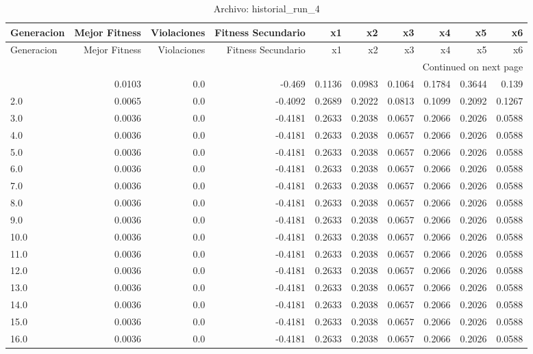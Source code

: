 \begin{longtable}{lrrrrrrrrr}
\caption{Archivo: historial\_run\_4}\label{tab:historial_run_4} \\
\toprule
Generacion & Mejor Fitness & Violaciones & Fitness Secundario & x1 & x2 & x3 & x4 & x5 & x6 \\
\midrule
\endfirsthead
\toprule
Generacion & Mejor Fitness & Violaciones & Fitness Secundario & x1 & x2 & x3 & x4 & x5 & x6 \\
\midrule
\endhead
\midrule
\multicolumn{10}{r}{Continued on next page} \\
\midrule
\endfoot
\bottomrule
\endlastfoot
1.0 & 0.0103 & 0.0 & -0.469 & 0.1136 & 0.0983 & 0.1064 & 0.1784 & 0.3644 & 0.139 \\
2.0 & 0.0065 & 0.0 & -0.4092 & 0.2689 & 0.2022 & 0.0813 & 0.1099 & 0.2092 & 0.1267 \\
3.0 & 0.0036 & 0.0 & -0.4181 & 0.2633 & 0.2038 & 0.0657 & 0.2066 & 0.2026 & 0.0588 \\
4.0 & 0.0036 & 0.0 & -0.4181 & 0.2633 & 0.2038 & 0.0657 & 0.2066 & 0.2026 & 0.0588 \\
5.0 & 0.0036 & 0.0 & -0.4181 & 0.2633 & 0.2038 & 0.0657 & 0.2066 & 0.2026 & 0.0588 \\
6.0 & 0.0036 & 0.0 & -0.4181 & 0.2633 & 0.2038 & 0.0657 & 0.2066 & 0.2026 & 0.0588 \\
7.0 & 0.0036 & 0.0 & -0.4181 & 0.2633 & 0.2038 & 0.0657 & 0.2066 & 0.2026 & 0.0588 \\
8.0 & 0.0036 & 0.0 & -0.4181 & 0.2633 & 0.2038 & 0.0657 & 0.2066 & 0.2026 & 0.0588 \\
9.0 & 0.0036 & 0.0 & -0.4181 & 0.2633 & 0.2038 & 0.0657 & 0.2066 & 0.2026 & 0.0588 \\
10.0 & 0.0036 & 0.0 & -0.4181 & 0.2633 & 0.2038 & 0.0657 & 0.2066 & 0.2026 & 0.0588 \\
11.0 & 0.0036 & 0.0 & -0.4181 & 0.2633 & 0.2038 & 0.0657 & 0.2066 & 0.2026 & 0.0588 \\
12.0 & 0.0036 & 0.0 & -0.4181 & 0.2633 & 0.2038 & 0.0657 & 0.2066 & 0.2026 & 0.0588 \\
13.0 & 0.0036 & 0.0 & -0.4181 & 0.2633 & 0.2038 & 0.0657 & 0.2066 & 0.2026 & 0.0588 \\
14.0 & 0.0036 & 0.0 & -0.4181 & 0.2633 & 0.2038 & 0.0657 & 0.2066 & 0.2026 & 0.0588 \\
15.0 & 0.0036 & 0.0 & -0.4181 & 0.2633 & 0.2038 & 0.0657 & 0.2066 & 0.2026 & 0.0588 \\
16.0 & 0.0036 & 0.0 & -0.4181 & 0.2633 & 0.2038 & 0.0657 & 0.2066 & 0.2026 & 0.0588 \\

\end{longtable}
